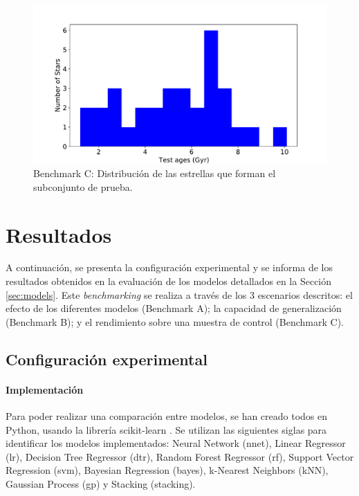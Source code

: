 \begin{figure}[H]
\begin{center}
 \includegraphics[width=0.8\linewidth]{Figuras/Experimentos/B_C_test.pdf}
\end{center}
\caption{Benchmark C: Distribución de las estrellas que forman el subconjunto de prueba.}
 \label{fig:benchC_test}
\end{figure}


\section{Resultados}
\label{sec:results}
A continuación, se presenta la configuración experimental y se informa de los resultados obtenidos en la evaluación de los modelos detallados en la Sección \ref{sec:models}. Este \emph{benchmarking} se realiza a través de los 3 escenarios descritos: el efecto de los diferentes modelos (Benchmark A); la capacidad de generalización (Benchmark B); y el rendimiento sobre una muestra de control (Benchmark C).

\subsection{Configuración experimental}

\paragraph{Implementación} 
Para poder realizar una comparación entre modelos, se han creado todos en Python, usando la librería scikit-learn \cite{scikit-learn}. Se utilizan las siguientes siglas para identificar los modelos implementados: Neural Network (nnet), Linear Regressor (lr), Decision Tree Regressor (dtr), Random Forest Regressor (rf), Support Vector Regression (svm), Bayesian Regression (bayes), k-Nearest Neighbors (kNN), Gaussian Process (gp) y Stacking (stacking).

